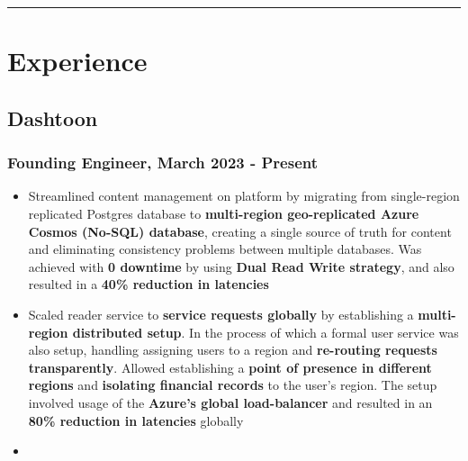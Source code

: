 \documentclass[12pt]{article}
\newcommand{\spacedhrule}[1]{
    \vspace{1ex}
    \hrule
    \vspace{#1}
}
\newcommand{\experienceItem}{\item [-] \small}
\begin{document}
    \vspace{-0.5ex}
    \spacedhrule{2ex}

    \section{Experience}
    {
        \subsection{Dashtoon}
        {
            \subsubsection{Founding Engineer, March 2023 - Present}
            {
                \begin{itemize}[itemsep=0.1ex, leftmargin=6ex, rightmargin=1ex]
                    \experienceItem
                    {
                        Streamlined content management on platform by migrating from single-region replicated Postgres
                        database to \textbf {multi-region geo-replicated Azure Cosmos (No-SQL) database}, \mbox {creating} a
                        single source of truth for content and eliminating consistency problems between multiple databases.
                        Was achieved with \textbf {0 downtime} by using \textbf {Dual Read Write strategy}, and also
                        \mbox {resulted} in a \textbf {40\% reduction in latencies}
                    }
                    \experienceItem
                    {
                        Scaled reader service to \textbf {service requests globally} by establishing a
                        \textbf {multi-region distributed setup}. In the process of which a formal user service was
                        also setup, handling assigning users to a region and \textbf {re-routing requests transparently}.
                        Allowed establishing a \textbf {point of presence in different regions} and
                        \textbf {isolating financial records} to the user's region. The setup involved usage of the
                        \textbf {Azure's global load-balancer} and resulted in an \textbf {80\% reduction in latencies}
                        \mbox{globally}
                    }
                    \experienceItem
                \end{itemize}
            }
        }
    }
\end{document}
